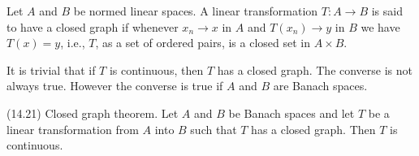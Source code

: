 Let $A$ and $B$ be normed linear spaces. A linear transformation $T: A \rightarrow B$ is said to have a closed graph if whenever $x_n \rightarrow x$ in $A$ and $T(x_n) \rightarrow y$ in $B$ we have $T(x) = y$, i.e., $T$, as a set of ordered pairs, is a closed set in $A \times B$.

It is trivial that if $T$ is continuous, then $T$ has a closed graph. The converse is not always true. However the converse is true if $A$ and $B$ are Banach spaces.

(14.21) Closed graph theorem. Let $A$ and $B$ be Banach spaces and let $T$ be a linear transformation from $A$ into $B$ such that $T$ has a closed graph. Then $T$ is continuous.